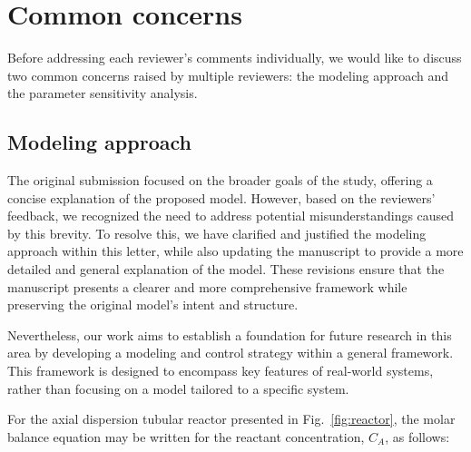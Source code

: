 \documentclass[12pt,answers]{exam}
\begin{document}
\section{Common concerns}

Before addressing each reviewer's comments individually, we would like to discuss two common concerns raised by multiple reviewers: the modeling approach and the parameter sensitivity analysis.

\subsection{Modeling approach}

The original submission focused on the broader goals of the study, offering a concise explanation of the proposed model. However, based on the reviewers’ feedback, we recognized the need to address potential misunderstandings caused by this brevity. To resolve this, we have clarified and justified the modeling approach within this letter, while also updating the manuscript to provide a more detailed and general explanation of the model. These revisions ensure that the manuscript presents a clearer and more comprehensive framework while preserving the original model’s intent and structure.


Nevertheless, our work aims to establish a foundation for future research in this area by developing a modeling and control strategy within a general framework. This framework is designed to encompass key features of real-world systems, rather than focusing on a model tailored to a specific system. 

For the axial dispersion tubular reactor presented in Fig.~\ref{fig:reactor}, the molar balance equation may be written for the reactant concentration, $C_A$, as follows:
\end{document}
